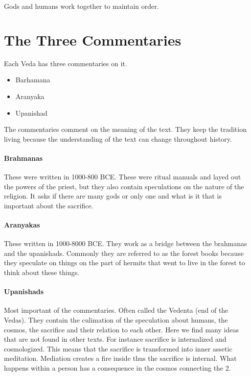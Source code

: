 \documentclass{article}
\begin{document}
Gods and humans work together to maintain order.

\section*{The Three Commentaries}
\label{sec:the_three_commentaries}
Each Veda has three commentaries on it.
\begin{itemize}
	\item Barhamana
	\item Aranyaka
	\item Upanishad
\end{itemize}

The commentaries comment on the meaning of the text. They keep the tradition living because the understanding of the text can change throughout history.

\paragraph{Brahmanas}
\label{par:brahmanas}
These were written in 1000-800 BCE. These were ritual manuals and layed out the powers of the priest, but they also contain speculations on the nature of the religion. It asks if there are many gods or only one and what is it that is important about the sacrifice.

\paragraph{Aranyakas}
\label{par:aranyakas}
These written in 1000-8000 BCE. They work as a bridge between the brahmanas and the upanishads. Commonly they are referred to as the forest books because they speculate on things on the part of hermits that went to live in the forest to think about these things.

\paragraph{Upanishads}
\label{par:upanishads}
Most important of the commentaries. Often called the Vedenta (end of the Vedas). They contain the culimation of the speculation about humans, the cosmos, the sacrifice and their relation to each other. Here we find many ideas that are not found in other texts. For instance sacrifice is internalized and cosmologized. This means that the sacrifice is transformed into inner assetic meditation. Mediation creates a fire inside thus the sacrifice is internal. What happens within a person has a consequence in the cosmos connecting the 2.
\end{document}
